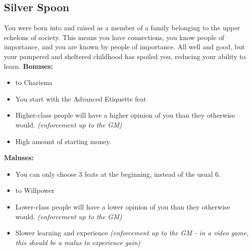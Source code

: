 \documentclass[openany,10pt,a4paper]{book}
\begin{document}
\begin{itemize}
\begin{itemize}
\begin{itemize}
\begin{itemize}
\section{Silver Spoon}
You were born into and raised as a member of a family belonging to the upper echelons of society. This means you have connections, you know people of importance, and you are known by people of importance. All well and good, but your pampered and sheltered childhood has spoiled you, reducing your ability to learn.\newline
\textbf{Bonuses:}
\begin{itemize}
	\item {} to Charisma
	\item You start with the Advanced Etiquette feat
	\item Higher-class people will have a higher opinion of you than they otherwise would. \textit{(enforcement up to the GM)}
	\item High amount of starting money.
\end{itemize}
\textbf{Maluses:}
\begin{itemize}
	\item You can only choose 3 feats at the beginning, instead of the usual 6.
	\item {} to Willpower
	\item Lower-class people will have a lower opinion of you than they otherwise would. \textit{(enforcement up to the GM)}
	\item Slower learning and experience \textit{(enforcement up to the GM - in a video game, this should be a malus to experience gain)}
\end{itemize}

\end{itemize}
\end{itemize}
\end{itemize}
\end{itemize}
\end{document}
